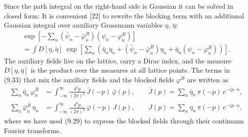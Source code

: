 Since the path integral on the right-hand side is Gaussian it can be solved in
closed form: It is convenient [22] to rewrite the blocking term with an
additional Gaussian integral over auxiliary Grassmann variables $\eta$,
$\bar\eta$:
\begin{multline}
  \exp\!\left[-\sum_n\left(\bar\psi_n-\bar\varphi^B_n\right)
    \left(\psi_n-\varphi^B_n\right)\right] \\
  = \int D[\eta,\bar\eta]\;
    \exp\!\left[\sum_n\left(\bar\eta_n\eta_n
      + \left(\bar\psi_n-\bar\varphi^B_n\right)\eta_n
      + \bar\eta_n\left(\psi_n-\varphi^B_n\right)\right)\right] .
\end{multline}
The auxiliary fields live on the lattice, carry a Dirac index, and the measure
$D[\eta,\bar\eta]$ is the product over the measures at all lattice points. The
terms in (9.33) that mix the auxiliary fields and the blocked fields
$\varphi^B$ are written as
\begin{align}
  \sum_n\bar\eta_n\,\varphi^B_n
  &= \int_{-\infty}^{\infty}\frac{d^4p}{(2\pi)^2}\,\bar J(-p)\,\bar\varphi(p) , \qquad
    \bar J(p) = \sum_n\bar\eta_n\,\pi(-p)\,e^{-ip\cdot n} , \nonumber\\
  \sum_n\bar\varphi^B_n\,\eta_n
  &= \int_{-\infty}^{\infty}\frac{d^4p}{(2\pi)^2}\,\bar\varphi(-p)\,J(p) , \qquad
    J(p) = \sum_n\eta_n\,\pi(-p)\,e^{-ip\cdot n} ,
\end{align}
where we have used (9.29) to express the blocked fields through their
continuum Fourier transforms.


